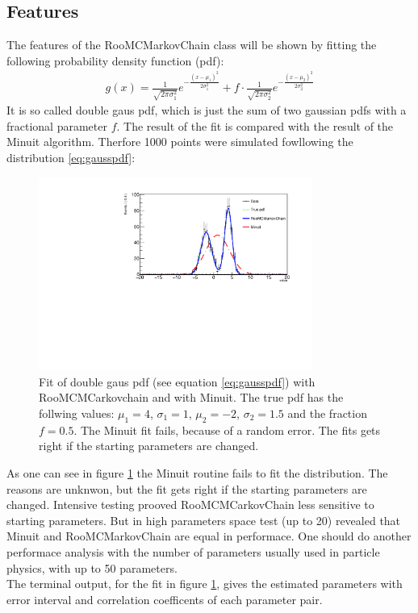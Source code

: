 \documentclass[english]{uzhpub}
\begin{document}
\subsection{Features} \label{sec:features}
 The features of the RooMCMarkovChain class will be shown by fitting the following probability density function (pdf):
\begin{align}
  g(x) = \frac{1}{\sqrt{2 \pi \sigma_1^2}} e^{- \frac{(x-\mu_1)^2}{2 \sigma_1^2}} + f \cdot  \frac{1}{\sqrt{2 \pi \sigma_2^2}} e^{- \frac{(x-\mu_2)^2}{2 \sigma_2^2}} \label{eq:gausspdf}
 \end{align}
It is so called double gaus pdf, which is just the sum of two gaussian pdfs with a fractional parameter $f$.
The result of the fit is compared with the result of the Minuit algorithm. Therfore 1000 points were simulated fowllowing the distribution \ref{eq:gausspdf}:

\begin{figure}[H]
  \centering
  \includegraphics[width=0.8\textwidth]{RooMCMC/twogausfit}
  \caption{Fit of double gaus pdf (see equation \ref{eq:gausspdf}) with RooMCMCarkovchain and with Minuit. The true pdf has the follwing values: $\mu_1 = 4$, $\sigma_1 = 1$, $\mu_2 = -2$, $\sigma_2 = 1.5$ and the fraction $f = 0.5$. The Minuit fit fails, because of a random error. The fits gets right if the starting parameters are changed.}
  \label{fig:twogaus}
\end{figure}
As one can see in figure \ref{fig:twogaus} the Minuit routine fails to fit the distribution. The reasons are unknwon, but the fit gets right if the starting parameters are changed. Intensive testing prooved RooMCMCarkovChain less sensitive to starting parameters. But in high parameters space test (up to 20) revealed that Minuit and RooMCMarkovChain are equal in performace. One should do another performace analysis with the number of parameters usually used in particle physics, with up to 50 parameters. \\
The terminal output, for the fit in figure \ref{fig:twogaus}, gives the estimated parameters with error interval and correlation coefficents of each parameter pair.
\end{document}

